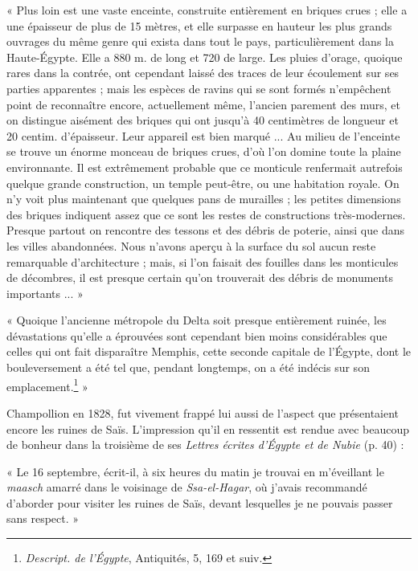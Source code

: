 \documentclass[letterpaper,twocolumn,openany,nodeprecatedcode]{dndbook}
\begin{document}
« Plus loin est une vaste enceinte, construite entièrement en briques crues ; elle a une épaisseur de plus de 15 mètres, et elle surpasse en hauteur les plus grands ouvrages du même genre qui exista dans tout le pays, particulièrement dans la Haute-Égypte. Elle a 880 m. de long et 720 de large. Les pluies d'orage, quoique rares dans la contrée, ont cependant laissé des traces de leur écoulement sur ses parties apparentes ; mais les espèces de ravins qui se sont formés n'empêchent point de reconnaître encore, actuellement même, l'ancien parement des murs, et on distingue aisément des briques qui ont jusqu'à 40 centimètres de longueur et 20 centim. d'épaisseur. Leur appareil est bien marqué ... Au milieu de l'enceinte se trouve un énorme monceau de briques crues, d'où l'on domine toute la plaine environnante. Il est extrêmement probable que ce monticule renfermait autrefois quelque grande construction, un temple peut-être, ou une habitation royale. On n'y voit plus maintenant que quelques pans de murailles ; les petites dimensions des briques indiquent assez que ce sont les restes de constructions très-modernes. Presque partout on rencontre des tessons et des débris de poterie, ainsi que dans les villes abandonnées. Nous n'avons aperçu à la surface du sol aucun reste remarquable d'architecture ; mais, si l'on faisait des fouilles dans les monticules de décombres, il est presque certain qu'on trouverait des débris de monuments importants ... »

« Quoique l'ancienne métropole du Delta soit presque entièrement ruinée, les dévastations qu'elle a éprouvées sont cependant bien moins considérables que celles qui ont fait disparaître Memphis, cette seconde capitale de l'Égypte, dont le bouleversement a été tel que, pendant longtemps, on a été indécis sur son emplacement.\footnote{\emph{Descript. de l'Égypte}, Antiquités, 5, 169 et suiv.} »

Champollion en 1828, fut vivement frappé lui aussi de l'aspect que présentaient encore les ruines de Saïs. L'impression qu'il en ressentit est rendue avec beaucoup de bonheur dans la troisième de ses \emph{Lettres écrites d'Égypte et de Nubie} (p. 40) :

« Le 16 septembre, écrit-il, à six heures du matin je trouvai en m'éveillant le \emph{maasch} amarré dans le voisinage de \emph{Ssa-el-Hagar}, où j'avais recommandé d'aborder pour visiter les ruines de Saïs, devant lesquelles je ne pouvais passer sans respect. »
\end{document}
